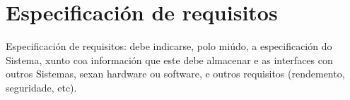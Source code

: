 \chapter{Especificación de requisitos}

Especificación de requisitos: debe indicarse, polo miúdo, a especificación do 
Sistema, xunto coa información que este debe almacenar e as interfaces con outros 
Sistemas, sexan hardware ou software, e outros requisitos (rendemento, seguridade, 
etc).
